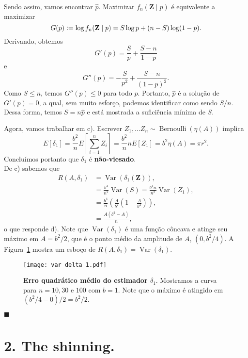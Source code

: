 \documentclass[a4paper,10pt, notitlepage]{report}
\newcommand{\vr}{\operatorname{Var}} %
\newcommand{\bfZ}{\mathbf{Z}}
\newcommand{\defeq}{\vcentcolon =}
\begin{document}
{Sendo assim, vamos encontrar \( \hat{ p } \).
Maximizar \( f_{ n } ( \bfZ \mid p ) \) é equivalente a maximizar
\begin{equation*}
    G ( p ) \defeq \log f_{ n } ( \bfZ \mid p ) = S \log p + ( n - S ) \log ( 1 - p )
.\end{equation*}
Derivando, obtemos
\begin{equation*}
    G' ( p ) = \frac{ S }{ p } + \frac{ S - n }{ 1 - p }
\end{equation*}
e
\begin{equation*}
    G'' ( p ) = - \frac{ S }{ p^2 } + \frac{ S - n }{ ( 1 - p )^2 }
.\end{equation*}
Como \( S \leq n \), temos \( G'' ( p ) \leq 0 \) para todo \( p \).
Portanto, \( \hat{ p } \) é a solução de \( G' ( p ) = 0 \), a qual, sem muito esforço, podemos identificar como sendo \( S/n \).
Dessa forma, temos \( S = n \hat{ p } \) e está mostrada a suficiência mínima de \( S \).

Agora, vamos trabalhar em c).
Escrever $Z_1, \ldots Z_n \sim \operatorname{Bernoulli}(\eta(A))$ implica
$$
E[\delta_1] = \frac{b^2}{n}E\left[\sum_{i=1}^n Z_i\right] = \frac{b^2}{n} n E[Z_1] = b^2\eta(A) = \pi r^2.
$$
Concluímos portanto que $\delta_1$ é \textbf{não-viesado}.
\\
De c) sabemos que 
\begin{align*}
R(A, \delta_1) &= \vr\left(\delta_1(\boldsymbol{Z})\right),\\
&= \frac{b^4}{n^2}\vr(S) = \frac{b^4n}{n^2}\vr(Z_1),\\
&= \frac{b^4}{n}\left(\frac{A}{b^2}\left(1-\frac{A}{b^2}\right)\right),\\
&= \frac{A(b^2-A)}{n},
\end{align*}
o que responde d).
Note que $\vr(\delta_1)$ é uma função côncava e atinge seu máximo em $A = b^2/2$, que é o ponto médio da amplitude de $A$, $(0, b^2/4)$.
A Figura~\ref{fig:var_delta_1} mostra um esboço de $R(A, \delta_1) = \vr\left(\delta_1\right)$.
\begin{figure}[!ht]
\begin{center}
\texttt{[image: var\_delta\_1.pdf]}    
\end{center}
\caption{\textbf{Erro quadrático médio do estimador $\delta_1$}.
Mostramos a curva para $n=10, 30$ e $100$ com $b=1$.
Note que o máximo é atingido em $(b^2/4 - 0)/2 = b^2/2$.
}
\label{fig:var_delta_1}
\end{figure}
$\blacksquare$
}
\newpage
\section*{2. The shinning.}
\end{document}
